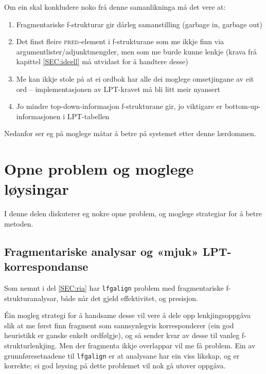 \documentclass[12pt,a4paper,oneside,draft]{report}
\newcommand{\F}[2]{\textsc{#1}\ensuremath{_{#2}}}
\newcommand{\PRED}{\F{pred}{}}
\begin{document}
Om ein skal konkludere noko frå denne samanlikninga må det vere at:
\begin{enumerate}
\item Fragmentariske f-strukturar gir dårleg samanstilling (garbage in,
   garbage out)
\item Det finst fleire \PRED{}-element i f-strukturane som me ikkje finn
   via argumentlister/adjunktmengder, men som me burde kunne lenkje
   (krava frå kapittel \ref{SEC:ideell} må utvidast for å handtere
   desse)
\item Me kan ikkje stole på at ei ordbok har alle dei moglege
   omsetjingane av eit ord -- implementasjonen av LPT-kravet må
   bli litt meir nyansert
\item Jo mindre top-down-informasjon f-strukturane gir, jo viktigare er
   bottom-up-informasjonen i LPT-tabellen
\end{enumerate}

Nedanfor ser eg på moglege måtar å betre på systemet etter denne
lærdommen.

\section{Opne problem og moglege løysingar}
\label{sec-5.4}

   \label{SEC:opneproblem}

I denne delen diskuterer eg nokre opne problem, og moglege strategiar
for å betre metoden.

\subsection{Fragmentariske analysar og «mjuk» LPT-korrespondanse}
\label{sec-5.4.1}

Som nemnt i del \ref{SEC:ria} har \texttt{lfgalign} problem med
 fragmentariske f-strukturanalysar, både når det gjeld effektivitet,
 og presisjon.

Éin mogleg strategi for å handsame desse vil vere å dele opp
 lenkjingsoppgåva slik at me først finn fragment som sannsynlegvis
 korresponderer (ein god heuristikk er ganske enkelt ordfølgje), og så
 sender kvar av desse til vanleg f-strukturlenkjing. Men der fragmenta
 ikkje overlappar vil me få problem. Ein av grunnføresetnadene til
 \texttt{lfgalign} er at analysane har ein viss likskap, og er korrekte; ei
 god løysing på dette problemet vil nok gå utover oppgåva.
\end{document}
